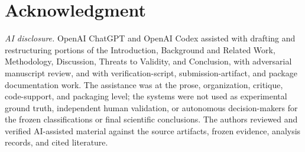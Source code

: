 \documentclass[conference]{IEEEtran}
\begin{document}
\section*{Acknowledgment}
\textit{AI disclosure.} OpenAI ChatGPT and OpenAI Codex assisted with drafting and restructuring portions of the Introduction, Background and Related Work, Methodology, Discussion, Threats to Validity, and Conclusion, with adversarial manuscript review, and with verification-script, submission-artifact, and package documentation work. The assistance was at the prose, organization, critique, code-support, and packaging level; the systems were not used as experimental ground truth, independent human validation, or autonomous decision-makers for the frozen classifications or final scientific conclusions. The authors reviewed and verified AI-assisted material against the source artifacts, frozen evidence, analysis records, and cited literature.



\end{document}
